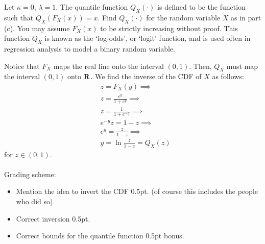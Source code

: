 \begin{exercise}[1]
Let $\kappa = 0$, $\lambda = 1$. The quantile function $Q_X(\cdot)$ is defined to be the function such that $Q_X(F_X(x)) = x$. Find $Q_X(\cdot)$ for the random variable $X$ as in part (c). You may assume $F_X(x)$ to be strictly increasing without proof. This function $Q_X$ is known as the `log-odds', or `logit' function, and is used often in regression analysis to model a binary random variable.
\begin{solution}
Notice that $F_X$ maps the real line onto the interval $(0,1)$. Then, $Q_X$ must map the interval $(0,1)$ onto $\bf{R}$. We find the inverse of the CDF of $X$ as follows:
\begin{align*}
    &z = F_X(y)\implies\\
    &z = \frac{e^{y}}{1+e^{y}}\implies\\
    &z = \frac{1}{1+e^{-y}}\implies\\
    &e^{-y}z = 1-z\implies\\
    &e^y = \frac{z}{1-z}\implies\\
    &y = \ln{\frac{z}{1-z}} = Q_X(z)
\end{align*}
for $z\in(0,1)$.
\\\\
Grading scheme:
\begin{itemize}
    \item Mention the idea to invert the CDF 0.5pt. (of course this includes the people who did so)
    \item Correct inversion 0.5pt.
    \item Correct bounds for the quantile function 0.5pt bonus.
\end{itemize}
\end{solution}
\end{exercise}
